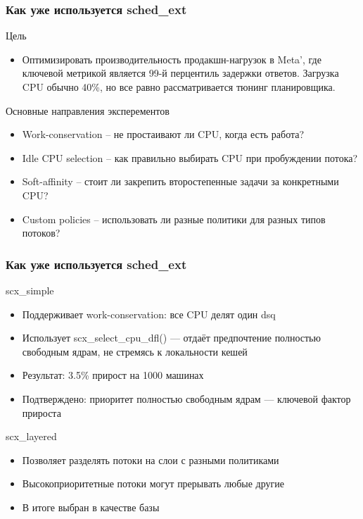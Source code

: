 \documentclass[aspectratio=169]{beamer}
\begin{document}
\begin{frame}
  \frametitle{Как уже используется sched\_ext}
  \begin{block}{Цель}
    \begin{itemize}
      \item Оптимизировать производительность продакшн-нагрузок в Meta',
        где ключевой метрикой является 99-й перцентиль задержки ответов.
        Загрузка CPU обычно 40\%, но все равно рассматривается тюнинг
        планировщика.
    \end{itemize}
  \end{block}
  \begin{block}{Основные направления эксперементов}
    \begin{itemize}
      \item Work-conservation – не простаивают ли CPU, когда есть работа?
      \item Idle CPU selection – как правильно выбирать CPU при пробуждении потока?
      \item Soft-affinity – стоит ли закрепить второстепенные задачи за конкретными CPU?
      \item Custom policies – использовать ли разные политики для разных типов потоков?
    \end{itemize}
  \end{block}
\end{frame}

\begin{frame}
  \frametitle{Как уже используется sched\_ext}
  \begin{block}{scx\_simple}
    \begin{itemize}
      \item Поддерживает work-conservation: все CPU делят один dsq
      \item Использует scx\_select\_cpu\_dfl() — отдаёт предпочтение полностью
        свободным ядрам, не стремясь к локальности кешей
      \item Результат: 3.5\% прирост на 1000 машинах
      \item Подтверждено: приоритет полностью свободным ядрам — ключевой фактор прироста
    \end{itemize}
  \end{block}
  \begin{block}{scx\_layered}
    \begin{itemize}
      \item Позволяет разделять потоки на слои с разными политиками
      \item Высокоприоритетные потоки могут прерывать любые другие
      \item В итоге выбран в качестве базы
    \end{itemize}
  \end{block}
\end{frame}
\end{document}

